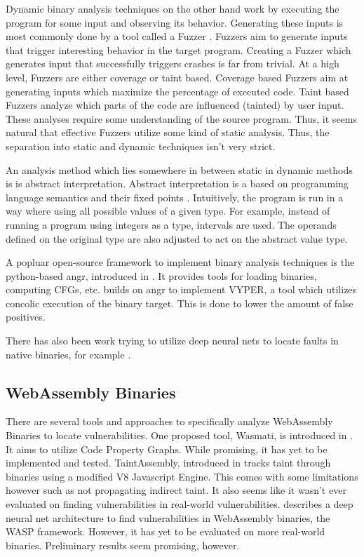 \documentclass[sigconf]{acmart}
\begin{document}
{Dynamic binary analysis techniques on the other hand work by executing the program for some input and observing its behavior. Generating these inputs is most commonly done by a tool called a Fuzzer \cite{li_fuzzing_2018}. Fuzzers aim to generate inputs that trigger interesting behavior in the target program. Creating a Fuzzer which generates input that successfully triggers crashes is far from trivial. At a high level, Fuzzers are either coverage or taint based. Coverage based Fuzzers aim at generating inputs which maximize the percentage of executed code. Taint based Fuzzers analyze which parts of the code are influenced (tainted) by user input. These analyses require some understanding of the source program. Thus, it seems natural that effective Fuzzers utilize some kind of static analysis. Thus, the separation into static and dynamic techniques isn't very strict.

An analysis method which lies somewhere in between static in dynamic methods is is abstract interpretation. Abstract interpretation is a based on programming language semantics and their fixed points \cite{cousot_abstract_2000}. Intuitively, the program is run in a way where using all possible values of a given type. For example, instead of running a program using integers as a type, intervals are used. The  operands defined on the original type are also adjusted to act on the abstract value type. 

A popluar open-source framework to implement binary analysis techniques is the python-based angr, introduced in \cite{shoshitaishvili_sok_2016}. It provides tools for loading binaries, computing CFGs, etc. \cite{boudjema_vyper_2020} builds on angr to implement VYPER, a tool which utilizes concolic execution of the binary target. This is done to lower the amount of false positives. 

There has also been work trying to utilize deep neural nets to locate faults in native binaries, for example \cite{li_locating_2019}.

\subsection{WebAssembly Binaries}
\label{sec:wasm_analysis}
There are several tools and approaches to specifically analyze WebAssembly Binaries to locate vulnerabilities. One proposed tool, Wasmati, is introduced in \cite{lopes_discovering_2021}. It aims to utilize Code Property Graphs. While promising, it has yet to be implemented and tested. TaintAssembly, introduced in \cite{fu_taintassembly_2018} tracks taint through binaries using a modified V8 Javascript Engine. This comes with some limitations however such as not propagating indirect taint. It also seems like it wasn't ever evaluated on finding vulnerabilities in real-world vulnerabilities. \cite{sun_poster_2021} describes a deep neural net architecture to find vulnerabilities in WebAssembly binaries, the WASP framework. However, it has yet to be evaluated on more real-world binaries. Preliminary results seem promising, however. 

}
\end{document}
